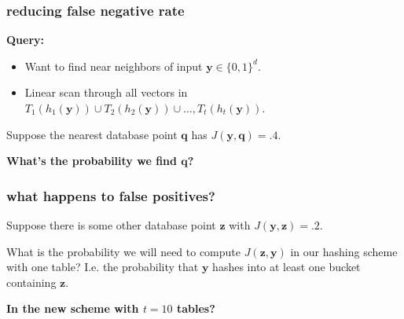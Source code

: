 \documentclass[compress]{beamer}
\newcommand{\bv}[1]{\mathbf{#1}}
\begin{document}
\begin{frame}
	\frametitle{reducing false negative rate}
	\textbf{Query:}
	\begin{itemize}
		\item Want to find near neighbors of input $\bv{y}\in\{0,1\}^d$.
		\item Linear scan through all vectors in $T_1(h_1(\bv{y}))\cup T_2(h_2(\bv{y}))\cup \ldots, T_t(h_t(\bv{y}))$.
	\end{itemize}

\vspace{2em}
	Suppose the nearest database point $\bv{q}$ has $J(\bv{y},\bv{q}) = .4$.
	\begin{center}
		\textbf{\alert{What's the probability we find $\bv{q}$?}}
	\end{center}
\end{frame}

\begin{frame}[t]
	\frametitle{what happens to false positives?}
	Suppose there is some other database point $\bv{z}$ with $J(\bv{y},\bv{z}) = .2$. 
	
	What is the probability we will need to compute $J(\bv{z},\bv{y})$ in our hashing scheme with one table? I.e. the probability that $\bv{y}$ hashes into at least one bucket containing $\bv{z}$. 
	
	\vspace{4em}
	{\textbf{\alert{In the new scheme with $t=10$ tables?}}}
	
\end{frame}
\end{document}
